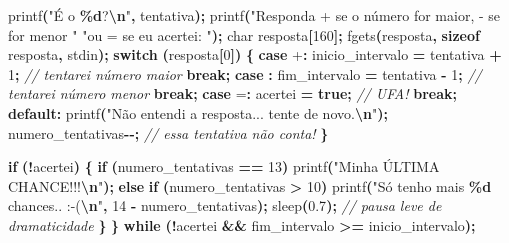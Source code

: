 \documentclass[
  11pt,
  a4paper,
]{scrbook}
\newenvironment{Shaded}{\begin{snugshade}}{\end{snugshade}}
\newcommand{\CharTok}[1]{\textcolor[rgb]{0.31,0.60,0.02}{#1}}
\newcommand{\CommentTok}[1]{\textcolor[rgb]{0.56,0.35,0.01}{\textit{#1}}}
\newcommand{\ControlFlowTok}[1]{\textcolor[rgb]{0.13,0.29,0.53}{\textbf{#1}}}
\newcommand{\DataTypeTok}[1]{\textcolor[rgb]{0.13,0.29,0.53}{#1}}
\newcommand{\DecValTok}[1]{\textcolor[rgb]{0.00,0.00,0.81}{#1}}
\newcommand{\FloatTok}[1]{\textcolor[rgb]{0.00,0.00,0.81}{#1}}
\newcommand{\KeywordTok}[1]{\textcolor[rgb]{0.13,0.29,0.53}{\textbf{#1}}}
\newcommand{\NormalTok}[1]{#1}
\newcommand{\OperatorTok}[1]{\textcolor[rgb]{0.81,0.36,0.00}{\textbf{#1}}}
\newcommand{\SpecialCharTok}[1]{\textcolor[rgb]{0.81,0.36,0.00}{\textbf{#1}}}
\newcommand{\StringTok}[1]{\textcolor[rgb]{0.31,0.60,0.02}{#1}}
\begin{document}
\begin{Shaded}
\begin{Highlighting}[]
\NormalTok{        printf}\OperatorTok{(}\StringTok{"É o }\SpecialCharTok{\%d}\StringTok{?}\SpecialCharTok{\textbackslash{}n}\StringTok{"}\OperatorTok{,}\NormalTok{ tentativa}\OperatorTok{);}
\NormalTok{        printf}\OperatorTok{(}\StringTok{"Responda + se o número for maior, {-} se for menor "}
               \StringTok{"ou = se eu acertei: "}\OperatorTok{);}
        \DataTypeTok{char}\NormalTok{ resposta}\OperatorTok{[}\DecValTok{160}\OperatorTok{];}
\NormalTok{        fgets}\OperatorTok{(}\NormalTok{resposta}\OperatorTok{,} \KeywordTok{sizeof}\NormalTok{ resposta}\OperatorTok{,}\NormalTok{ stdin}\OperatorTok{);}
        \ControlFlowTok{switch} \OperatorTok{(}\NormalTok{resposta}\OperatorTok{[}\DecValTok{0}\OperatorTok{])} \OperatorTok{\{}
            \ControlFlowTok{case} \CharTok{\textquotesingle{}+\textquotesingle{}}\OperatorTok{:}
\NormalTok{                inicio\_intervalo }\OperatorTok{=}\NormalTok{ tentativa }\OperatorTok{+} \DecValTok{1}\OperatorTok{;}  \CommentTok{// tentarei número maior}
                \ControlFlowTok{break}\OperatorTok{;}
            \ControlFlowTok{case} \CharTok{\textquotesingle{}{-}\textquotesingle{}}\OperatorTok{:}
\NormalTok{                fim\_intervalo }\OperatorTok{=}\NormalTok{ tentativa }\OperatorTok{{-}} \DecValTok{1}\OperatorTok{;}  \CommentTok{// tentarei número menor}
                \ControlFlowTok{break}\OperatorTok{;}
            \ControlFlowTok{case} \CharTok{\textquotesingle{}=\textquotesingle{}}\OperatorTok{:}
\NormalTok{                acertei }\OperatorTok{=} \KeywordTok{true}\OperatorTok{;}  \CommentTok{// UFA!}
                \ControlFlowTok{break}\OperatorTok{;}
            \ControlFlowTok{default}\OperatorTok{:}
\NormalTok{                printf}\OperatorTok{(}\StringTok{"Não entendi a resposta... tente de novo.}\SpecialCharTok{\textbackslash{}n}\StringTok{"}\OperatorTok{);}
\NormalTok{                numero\_tentativas}\OperatorTok{{-}{-};}  \CommentTok{// essa tentativa não conta!}
        \OperatorTok{\}}

        \ControlFlowTok{if} \OperatorTok{(!}\NormalTok{acertei}\OperatorTok{)} \OperatorTok{\{}
            \ControlFlowTok{if} \OperatorTok{(}\NormalTok{numero\_tentativas }\OperatorTok{==} \DecValTok{13}\OperatorTok{)}
\NormalTok{                printf}\OperatorTok{(}\StringTok{"Minha ÚLTIMA CHANCE!!!}\SpecialCharTok{\textbackslash{}n}\StringTok{"}\OperatorTok{);}
            \ControlFlowTok{else} \ControlFlowTok{if} \OperatorTok{(}\NormalTok{numero\_tentativas }\OperatorTok{\textgreater{}} \DecValTok{10}\OperatorTok{)}
\NormalTok{                printf}\OperatorTok{(}\StringTok{"Só tenho mais }\SpecialCharTok{\%d}\StringTok{ chances.. :{-}(}\SpecialCharTok{\textbackslash{}n}\StringTok{"}\OperatorTok{,}
                       \DecValTok{14} \OperatorTok{{-}}\NormalTok{ numero\_tentativas}\OperatorTok{);}
\NormalTok{            sleep}\OperatorTok{(}\FloatTok{0.7}\OperatorTok{);}  \CommentTok{// pausa leve de dramaticidade}
        \OperatorTok{\}}
    \OperatorTok{\}} \ControlFlowTok{while} \OperatorTok{(!}\NormalTok{acertei }\OperatorTok{\&\&}\NormalTok{ fim\_intervalo }\OperatorTok{\textgreater{}=}\NormalTok{ inicio\_intervalo}\OperatorTok{);}


\end{Highlighting}
\end{Shaded}
\end{document}
